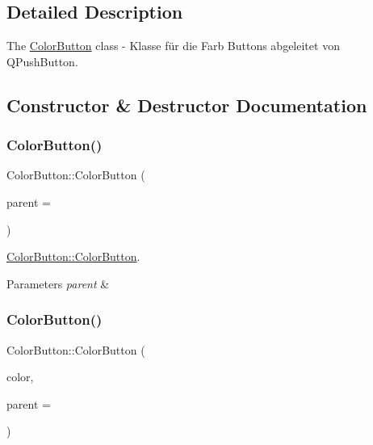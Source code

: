 \subsection{Detailed Description}
The \hyperlink{class_color_button}{Color\+Button} class -\/ Klasse für die Farb Buttons abgeleitet von Q\+Push\+Button. 

\subsection{Constructor \& Destructor Documentation}
\mbox{\label{class_color_button_a128b21900f22efdc9d71d0bffa0b64f8}} 
\subsubsection{\texorpdfstring{Color\+Button()}{ColorButton()}\hspace{0.1cm}{\footnotesize\ttfamily [1/2]}}
{\footnotesize\ttfamily Color\+Button\+::\+Color\+Button (\begin{DoxyParamCaption}\item[{Q\+Widget $\ast$}]{parent = {} }\end{DoxyParamCaption})\hspace{0.3cm}{\ttfamily [explicit]}}



\hyperlink{class_color_button_a128b21900f22efdc9d71d0bffa0b64f8}{Color\+Button\+::\+Color\+Button}. 


\begin{DoxyParams}{Parameters}
{\em parent} & \\
\hline
\end{DoxyParams}
\mbox{\label{class_color_button_a16f9cc31b3476fc5cb900e3692d4f49c}} 
\subsubsection{\texorpdfstring{Color\+Button()}{ColorButton()}\hspace{0.1cm}{\footnotesize\ttfamily [2/2]}}
{\footnotesize\ttfamily Color\+Button\+::\+Color\+Button (\begin{DoxyParamCaption}\item[{Q\+Color}]{color,  }\item[{Q\+Widget $\ast$}]{parent = {} }\end{DoxyParamCaption})\hspace{0.3cm}{\ttfamily [explicit]}}



